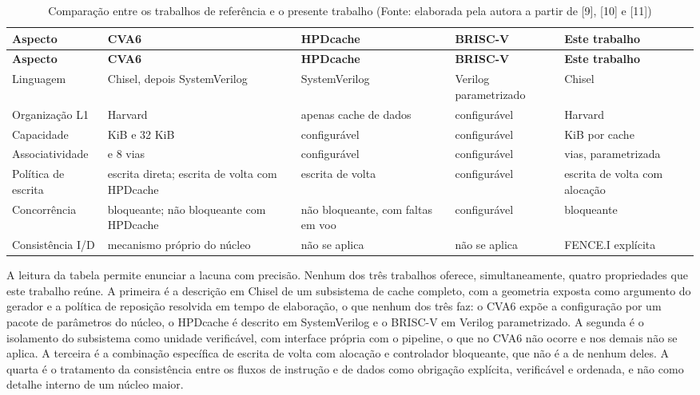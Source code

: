{\small
\begin{longtable}{@{}>{\raggedright\arraybackslash}p{}>{\raggedright\arraybackslash}p{}>{\raggedright\arraybackslash}p{}>{\raggedright\arraybackslash}p{}>{\raggedright\arraybackslash}p{}@{}}
\caption[Comparação entre os trabalhos de referência e o presente trabalho]{Comparação entre os trabalhos de referência e o presente trabalho (Fonte: elaborada pela autora a partir de {[}9{]}, {[}10{]} e {[}11{]})}\label{tab:3.1}\\
\hline
\textbf{Aspecto} & \textbf{CVA6~\cite{zaruba2019cost}} & \textbf{HPDcache~\cite{million2024hpdcache}} & \textbf{BRISC-V~\cite{bandara2019briscv}} & \textbf{Este trabalho} \\
\hline
\endfirsthead
\hline
\textbf{Aspecto} & \textbf{CVA6~\cite{zaruba2019cost}} & \textbf{HPDcache~\cite{million2024hpdcache}} & \textbf{BRISC-V~\cite{bandara2019briscv}} & \textbf{Este trabalho} \\
\hline
\endhead
\hline
\endlastfoot
Linguagem & Chisel, depois SystemVerilog & SystemVerilog & Verilog parametrizado & Chisel \\
Organização L1 & Harvard & apenas cache de dados & configurável & Harvard \\
Capacidade & 16 KiB e 32 KiB & configurável & configurável & 8 KiB por cache \\
Associatividade & 4 e 8 vias & configurável & configurável & 4 vias, parametrizada \\
Política de escrita & escrita direta; escrita de volta com HPDcache & escrita de volta & configurável & escrita de volta com alocação \\
Concorrência & bloqueante; não bloqueante com HPDcache & não bloqueante, com faltas em voo & configurável & bloqueante \\
Consistência I/D & mecanismo próprio do núcleo & não se aplica & não se aplica & FENCE.I explícita \\
\end{longtable}
}

A leitura da tabela permite enunciar a lacuna com precisão. Nenhum dos três trabalhos oferece, simultaneamente, quatro propriedades que este trabalho reúne. A primeira é a descrição em Chisel de um subsistema de cache completo, com a geometria exposta como argumento do gerador e a política de reposição resolvida em tempo de elaboração, o que nenhum dos três faz: o CVA6 expõe a configuração por um pacote de parâmetros do núcleo, o HPDcache é descrito em SystemVerilog e o BRISC-V em Verilog parametrizado. A segunda é o isolamento do subsistema como unidade verificável, com interface própria com o pipeline, o que no CVA6 não ocorre e nos demais não se aplica. A terceira é a combinação específica de escrita de volta com alocação e controlador bloqueante, que não é a de nenhum deles. A quarta é o tratamento da consistência entre os fluxos de instrução e de dados como obrigação explícita, verificável e ordenada, e não como detalhe interno de um núcleo maior.

